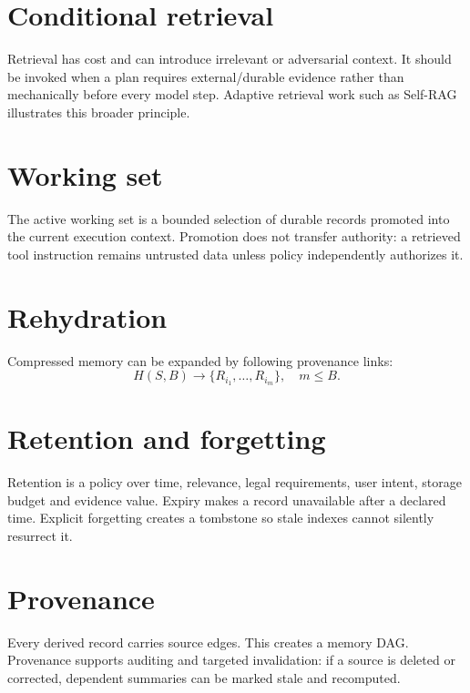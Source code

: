 
\section{Conditional retrieval}
Retrieval has cost and can introduce irrelevant or adversarial context. It should be invoked when a plan requires external/durable evidence rather than mechanically before every model step. Adaptive retrieval work such as Self-RAG illustrates this broader principle.

\section{Working set}
The active working set is a bounded selection of durable records promoted into the current execution context. Promotion does not transfer authority: a retrieved tool instruction remains untrusted data unless policy independently authorizes it.

\section{Rehydration}
Compressed memory can be expanded by following provenance links:
\[
H(S,B)\rightarrow \{R_{i_1},\ldots,R_{i_m}\},\quad m\le B.
\]

\section{Retention and forgetting}
Retention is a policy over time, relevance, legal requirements, user intent, storage budget and evidence value. Expiry makes a record unavailable after a declared time. Explicit forgetting creates a tombstone so stale indexes cannot silently resurrect it.

\section{Provenance}
Every derived record carries source edges. This creates a memory DAG. Provenance supports auditing and targeted invalidation: if a source is deleted or corrected, dependent summaries can be marked stale and recomputed.

